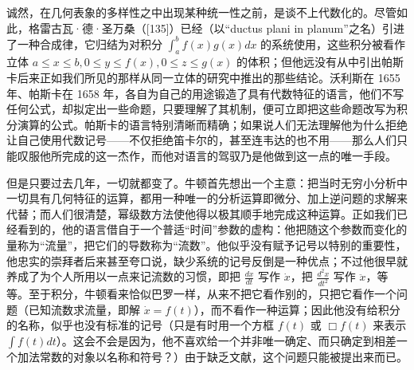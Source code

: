 诚然，在几何表象的多样性之中出现某种统一性之前，是谈不上代数化的。尽管如此，格雷古瓦·德·圣万桑（{[}135{]}）已经（以“ductus plani in planum”之名）引进了一种合成律，它归结为对积分 \(\int_{a}^{b} f(x) g(x) dx\) 的系统使用，这些积分被看作立体 \(a \leq x \leq b, 0 \leq y \leq f(x), 0 \leq z \leq g(x)\) 的体积；但他远没有从中引出帕斯卡后来正如我们所见的那样从同一立体的研究中推出的那些结论。沃利斯在 1655 年、帕斯卡在 1658 年，各自为自己的用途锻造了具有代数特征的语言，他们不写任何公式，却拟定出一些命题，只要理解了其机制，便可立即把这些命题改写为积分演算的公式。帕斯卡的语言特别清晰而精确；如果说人们无法理解他为什么拒绝让自己使用代数记号——不仅拒绝笛卡尔的，甚至连韦达的也不用——那么人们只能叹服他所完成的这一杰作，而他对语言的驾驭乃是他做到这一点的唯一手段。

但是只要过去几年，一切就都变了。牛顿首先想出一个主意：把当时无穷小分析中一切具有几何特征的运算，都用一种唯一的分析运算即微分、加上逆问题的求解来代替；而人们很清楚，幂级数方法使他得以极其顺手地完成这种运算。正如我们已经看到的，他的语言借自于一个普适“时间”参数的虚构：他把随这个参数而变化的量称为“流量”，把它们的导数称为“流数”。他似乎没有赋予记号以特别的重要性，他忠实的崇拜者后来甚至夸口说，缺少系统的记号反倒是一种优点；不过他很早就养成了为个人所用以一点来记流数的习惯，即把 \(\frac{dx}{dt}\) 写作 \(\dot{x}\)，把 \(\frac{d^{2}x}{dt^{2}}\) 写作 \(\ddot{x}\)，等等。至于积分，牛顿看来恰似巴罗一样，从来不把它看作别的，只把它看作一个问题（已知流数求流量，即解 \(\dot{x}=f(t)\)），而不看作一种运算；因此他没有给积分的名称，似乎也没有标准的记号（只是有时用一个方框 \(\boxed{f(t)}\) 或 \(\Box f(t)\) 来表示 \(\int f(t)dt\)）。这会不会是因为，他不喜欢给一个并非唯一确定、而只确定到相差一个加法常数的对象以名称和符号？）由于缺乏文献，这个问题只能被提出来而已。

